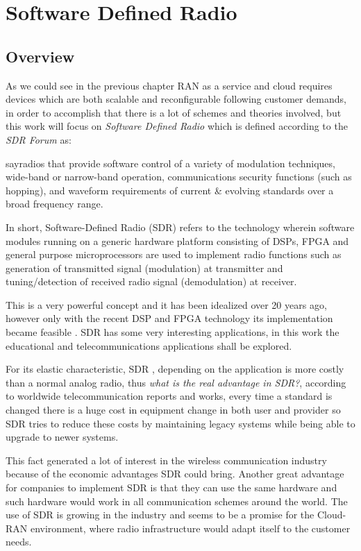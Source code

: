 \chapter{Software Defined Radio}

\section{Overview}
\label{sdr:overview}

As we could see in the previous chapter RAN as a service and cloud requires
devices which are both scalable and reconfigurable following customer demands,
in order to accomplish that there is a lot of schemes and theories involved,
but this work will focus on \emph{Software Defined Radio} which is defined
according to the \emph{SDR Forum} \cite{web:sdrforum} as:

say{radios that provide software control of a variety of modulation techniques,
wide-band or narrow-band operation, communications security functions
(such as hopping), and waveform requirements of current \& evolving standards
over a broad frequency range.}

In short, Software-Defined Radio (SDR) refers to the technology wherein software
 modules running on a generic hardware platform consisting of DSPs, FPGA and
 general purpose microprocessors are used to implement radio functions such as
 generation of transmitted signal (modulation) at transmitter and tuning/detection
 of received radio signal (demodulation) at receiver.


This is a very powerful concept and it has been idealized over 20 years ago,
however only with the recent DSP and FPGA technology its implementation became
feasible \cite{ladimer2009}. SDR has some very interesting applications, in this
work the educational and telecommunications applications shall be explored.

For its elastic characteristic, SDR , depending on the application is more
costly than a normal analog radio, thus \emph{what is the real advantage in SDR?},
according to worldwide telecommunication reports and works, every time a standard
is changed there is a huge cost in equipment change in both user and provider so
SDR tries to reduce these costs by maintaining legacy systems while being able
to upgrade to newer systems\cite{dayananda2012}.

This fact generated a lot of interest in the wireless communication industry
because of the economic advantages SDR could bring. Another great advantage
for companies to implement SDR is that they can use the same hardware and such
hardware would work in all communication schemes around the world. The use of
SDR is growing in the industry and seems to be a promise for the Cloud-RAN
environment, where radio infrastructure would adapt itself to the customer needs.

